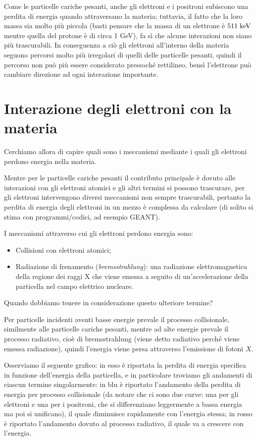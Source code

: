 Come le particelle cariche pesanti, anche gli elettroni e i positroni subiscono una perdita di energia quando attraversano la materia; tuttavia, il fatto che la loro massa sia molto più piccola (basti pensare che la massa di un elettrone è $511 \; \rm keV$ mentre quella del protone è di circa 1 GeV), fa sì che alcune interazioni non siano più trascurabili. In conseguenza a ciò gli elettroni all'interno della materia seguono percorsi molto più irregolari di quelli delle particelle pesanti, quindi il percorso non può più essere considerato pressoché rettilineo, bensì l'elettrone può cambiare direzione ad ogni interazione importante.

\section{Interazione degli elettroni con la materia}

Cerchiamo allora di capire quali sono i meccanismi mediante i quali gli elettroni perdono energia nella materia.

Mentre per le particelle cariche pesanti il contributo principale è dovuto alle interazioni con gli elettroni atomici e gli altri termini si possono trascurare, per gli elettroni intervengono diversi meccanismi non sempre trascurabili, pertanto la perdita di energia degli elettroni in un mezzo è complessa da calcolare (di solito si stima con programmi/codici, ad esempio GEANT).

I meccanismi attraverso cui gli elettroni perdono energia sono:

\begin{itemize}
    \item Collisioni con elettroni atomici;
    \item Radiazione di frenamento (\textit{bremsstrahlung}): una radiazione elettromagnetica della regione dei raggi X che viene emessa a seguito di un'accelerazione della particella nel campo elettrico nucleare.
\end{itemize}

Quando dobbiamo tenere in considerazione questo ulteriore termine?

Per particelle incidenti aventi basse energie prevale il processo collisionale, similmente alle particelle cariche pesanti, mentre ad alte energie prevale il processo radiativo, cioè di bremsstrahlung (viene detto radiativo perché viene emessa radiazione), quindi l'energia viene persa attraverso l'emissione di fotoni $X$.

Osserviamo il seguente grafico: in esso è riportata la perdita di energia specifica in funzione dell'energia della particella, e in particolare troviamo gli andamenti di ciascun termine singolarmente: in blu è riportato l'andamento della perdita di energia per processo collisionale (da notare che ci sono due curve: una per gli elettroni e una per i positroni, che si differenziano leggermente a bassa energia ma poi si unificano), il quale diminuisce rapidamente con l'energia stessa; in rosso è riportato l'andamento dovuto al processo radiativo, il quale va a crescere con l'energia.

